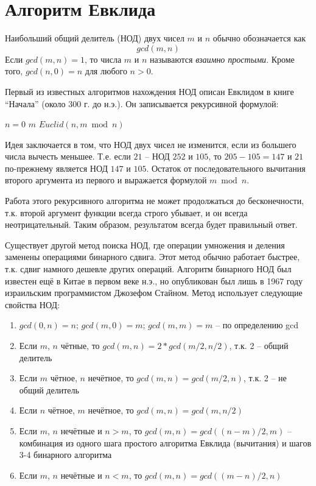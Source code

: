 \documentclass[a4paper,11pt]{article}
\begin{document}
\section{Алгоритм Евклида}
Наибольший общий делитель (НОД) двух чисел $m$ и $n$ обычно обозначается как
\begin{equation*}
  gcd(m, n)
\end{equation*}
Если $gcd(m, n) = 1$, то числа $m$ и $n$ называются \emph{взаимно простыми}.
Кроме того, $gcd(n, 0) = n$ для любого $n > 0$.

Первый из известных алгоритмов нахождения НОД описан Евклидом в книге 
``Начала'' (около 300 г. до н.э.). Он записывается рекурсивной формулой:
\begin{codebox}
  \li \If $n = 0$
  \li \Then \Return $m$
  \li \Else \Return $Euclid(n, m \bmod n)$
      \End
\end{codebox}

Идея заключается в том, что НОД двух чисел не изменится, если из большего числа
вычесть меньшее. Т.е. если $21$ -- НОД $252$ и $105$, то $205-105 = 147$ и
$21$ по-прежнему является НОД $147$ и $105$. Остаток от последовательного 
вычитания второго аргумента из первого и выражается формулой $m \bmod n$.

Работа этого рекурсивного алгоритма не может продолжаться до бесконечности,
т.к. второй аргумент функции всегда строго убывает, и он всегда неотрицательный.
Таким образом, результатом всегда будет правильный ответ.

Существует другой метод поиска НОД, где операции умножения и деления заменены
операциями бинарного сдвига. Этот метод обычно работает быстрее, т.к. сдвиг
намного дешевле других операций. Алгоритм бинарного НОД был известен ещё в
Китае в первом веке н.э., но опубликован был лишь в 1967 году израильским 
программистом Джозефом Стайном. Метод использует следующие свойства НОД:

\begin{enumerate}
\item $gcd(0, n) = n$; $gcd(m, 0) = m$; $gcd(m, m) = m$ -- по определению gcd
\item Если $m$, $n$ чётные, то $gcd(m, n) = 2*gcd(m/2, n/2)$, т.к. 2 -- общий 
  делитель
\item Если $m$ чётное, $n$ нечётное, то $gcd(m, n) = gcd(m/2, n)$, т.к. 2 -- не
  общий делитель
\item Если $n$ чётное, $m$ нечётное, то $gcd(m, n) = gcd(m, n/2)$
\item Если $m$, $n$ нечётные и $n > m$, то $gcd(m, n) = gcd((n - m)/2, m)$ -- 
  комбинация из одного шага простого алгоритма Евклида (вычитания) и шагов 3-4
  бинарного алгоритма
\item Если $m$, $n$ нечётные и $n < m$, то $gcd(m, n) = gcd((m - n)/2, n)$
\end{enumerate}
\end{document}
